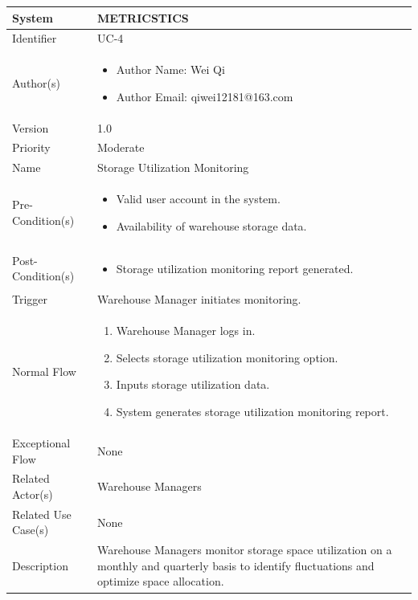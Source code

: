 \begin{center}
	\begin{tabularx}{\textwidth}{|l|X|}
		\hline
		System & METRICSTICS \\
		\hline
		Identifier & UC-4 \\
		\hline
		Author(s) & \begin{itemize}[left=0pt]
			\item Author Name: Wei Qi
			\item Author Email: qiwei12181@163.com
		\end{itemize} \\
		\hline
		Version & 1.0 \\
		\hline
		Priority & Moderate \\
		\hline
		Name & Storage Utilization Monitoring \\
		\hline
		Pre-Condition(s) &  \begin{itemize}[left=0pt]
			\item Valid user account in the system.
			\item Availability of warehouse storage data.
		\end{itemize} \\
		\hline
		Post-Condition(s) & \begin{itemize}[left=0pt]
			\item Storage utilization monitoring report generated.
		\end{itemize} \\
		\hline
		Trigger & Warehouse Manager initiates monitoring. \\
		\hline
		Normal Flow & \begin{enumerate}[left=0pt]
			\item Warehouse Manager logs in.
			\item Selects storage utilization monitoring option.
			\item Inputs storage utilization data.
			\item System generates storage utilization monitoring report.
		\end{enumerate} \\
		\hline
		Exceptional Flow & None \\
		\hline
		Related Actor(s) & Warehouse Managers \\
		\hline
		Related Use Case(s) & None \\
		\hline
		Description & Warehouse Managers monitor storage space utilization on a monthly and quarterly basis to identify fluctuations and optimize space allocation. \\
		\hline
	\end{tabularx}
\end{center}

